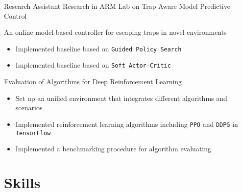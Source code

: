 \documentclass[10pt, a4paper, sans]{moderncv}
\begin{document}
{Research Assistant}
{Research in ARM Lab on Trap Aware Model Predictive Control}
{}{}
{An online model-based controller for escaping traps in novel environments
	\begin{itemize}
		\item Implemented baseline based on \texttt{Guided Policy Search}
		\item Implemented baseline based on \texttt{Soft Actor-Critic}
	\end{itemize}
}


{{Evaluation of Algorithms for Deep Reinforcement Learning}
	\begin{itemize}
		\item Set up an unified environment that integrates different algorithms and scenarios
		\item Implemented reinforcement learning algorithms including \texttt{PPO} and \texttt{DDPG} in \texttt{TensorFlow}
		\item Implemented a benchmarking procedure for algorithm evaluating
	\end{itemize}
}


\section{Skills}
\end{document}
